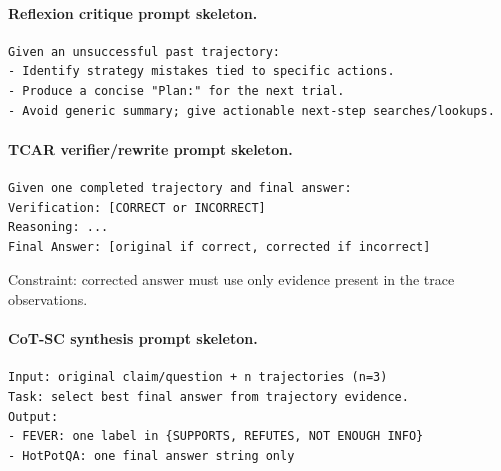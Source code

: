 \paragraph{Reflexion critique prompt skeleton.}
\begin{verbatim}
Given an unsuccessful past trajectory:
- Identify strategy mistakes tied to specific actions.
- Produce a concise "Plan:" for the next trial.
- Avoid generic summary; give actionable next-step searches/lookups.
\end{verbatim}

\paragraph{TCAR verifier/rewrite prompt skeleton.}
\begin{verbatim}
Given one completed trajectory and final answer:
Verification: [CORRECT or INCORRECT]
Reasoning: ...
Final Answer: [original if correct, corrected if incorrect]
\end{verbatim}
Constraint: corrected answer must use only evidence present in the trace observations.

\paragraph{CoT-SC synthesis prompt skeleton.}
\begin{verbatim}
Input: original claim/question + n trajectories (n=3)
Task: select best final answer from trajectory evidence.
Output:
- FEVER: one label in {SUPPORTS, REFUTES, NOT ENOUGH INFO}
- HotPotQA: one final answer string only
\end{verbatim}

